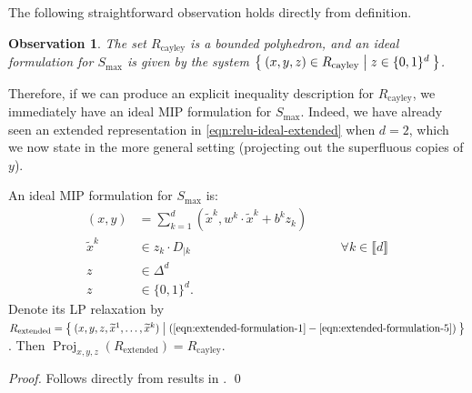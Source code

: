 \documentclass[smallextended]{svjour3}
\newcommand{\blue}[1]{{#1}}
\newcommand{\Proj}{\operatorname{Proj}}
\newcommand{\tx}{\widetilde{x}}
\newcommand{\Rcayley}{R_{\operatorname{cayley}}}
\newcommand{\Rextended}{R_{\operatorname{extended}}}
\newcommand{\Smax}{S_{\operatorname{max}}}
\newtheorem{observation}{Observation}
\begin{document}
The following straightforward observation holds directly from definition.

\begin{observation}
The set $\Rcayley$ is a bounded polyhedron, and an ideal formulation for $\Smax$ is given by the system $\Set{(x,y,z) \in \Rcayley | z \in \{0,1\}^d}$.
\end{observation}

Therefore, if we can produce an explicit inequality description for $\Rcayley$, we immediately have an ideal MIP formulation for $\Smax$. Indeed, we have already seen an extended representation in \eqref{eqn:relu-ideal-extended} when $d=2$, which we now state in the more general setting (projecting out the superfluous copies of $y$).

\begin{proposition}\label{prop:extended-formulation-cayley}
An ideal MIP formulation for $\Smax$ is:
    \begin{subequations}\label{eqn:extended-formulation}
    \begin{alignat}{2}
    (x,y) &= \sum_{k=1}^d (\tx^k, w^k \cdot \tx^k + b^kz_k) \label{eqn:extended-formulation-1} \\
    \tx^k &\in z_k \cdot D_{|k} &\quad &\forall k \in \llbracket d \rrbracket \label{eqn:extended-formulation-4} \\
    z &\in \Delta^d \label{eqn:extended-formulation-5} \\
    z &\in \{0,1\}^d.
    \end{alignat}
    \end{subequations}
    Denote its LP relaxation by $\Rextended = \Set{(x,y,z,\tx^1,\ldots,\tx^k) | (\ref{eqn:extended-formulation-1}-\ref{eqn:extended-formulation-5})}$. Then $\Proj_{x,y,z}(\Rextended) = \Rcayley$.
\end{proposition}
\blue{
\begin{proof}
Follows directly from results in \cite{Balas:1985,Balas:1998}.
\qed\end{proof}}
\end{document}
